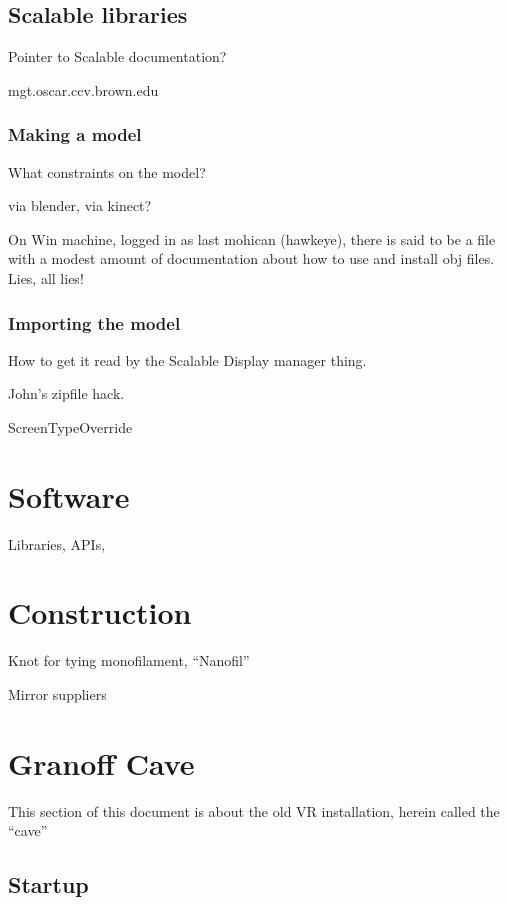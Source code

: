 \documentclass[11pt]{article}
\begin{document}
\subsection{Scalable libraries}

Pointer to Scalable documentation?

mgt.oscar.ccv.brown.edu


\subsubsection{Making a model}

What constraints on the model?

via blender, via kinect?

On Win machine, logged in as last mohican (hawkeye), there is said to
be a file with a modest amount of documentation about how to use and
install obj files.  Lies, all lies!


\subsubsection{Importing the model}

How to get it read by the Scalable Display manager thing.

John's zipfile hack.


ScreenTypeOverride


\section{Software}

Libraries, APIs,


\section{Construction}

Knot for tying monofilament, ``Nanofil''

Mirror suppliers



\section{Granoff Cave}

This section of this document is about the old VR installation, herein
called the ``cave''

\subsection{Startup}
\end{document}

